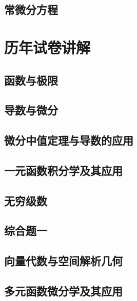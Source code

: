 \documentclass[openany,customfont=true]{HTNotes}
\begin{document}
  \chapter{常微分方程}

\part{历年试卷讲解}
  \chapter{函数与极限}\label{cha:1}

  \chapter{导数与微分}\label{cha:2}

  \chapter{微分中值定理与导数的应用}\label{cha:3}

  \chapter{一元函数积分学及其应用}\label{cha:4}

  \chapter{无穷级数}\label{cha:5}

  \chapter*{综合题一}

  \chapter{向量代数与空间解析几何}\label{cha:6}

  \chapter{多元函数微分学及其应用}\label{cha:7}
\end{document}
